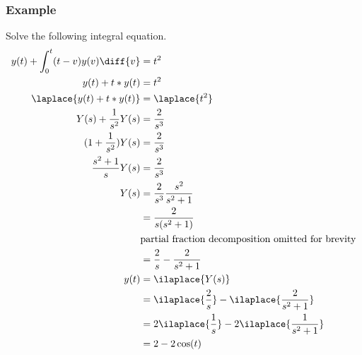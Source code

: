 \documentclass{math}
\begin{document}
\subsubsection*{Example}
Solve the following integral equation.
\begin{align*}
  y(t)+\int_{0}^{t}(t-v)y(v)\diff{v} &= t^2 \\
  y(t)+t*y(t) &= t^2 \\
  \laplace{y(t)+t*y(t)} &= \laplace{t^2} \\
  Y(s)+\frac{1}{s^2}Y(s) &= \frac{2}{s^3} \\
  (1+\frac{1}{s^2})Y(s) &= \frac{2}{s^3} \\
  \frac{s^2+1}{s}Y(s) &= \frac{2}{s^3} \\
  Y(s) &= \frac{2}{s^3}\frac{s^2}{s^2+1} \\
  &= \frac{2}{s(s^2+1)} \\
  & \text{partial fraction decomposition omitted for brevity} \\
  &= \frac{2}{s}-\frac{2}{s^2+1} \\
  y(t) &= \ilaplace{Y(s)} \\
  &= \ilaplace{\frac{2}{s}}-\ilaplace{\frac{2}{s^2+1}} \\
  &= 2\ilaplace{\frac{1}{s}}-2\ilaplace{\frac{1}{s^2+1}} \\
  &= 2-2\cos(t)
\end{align*}
\end{document}
